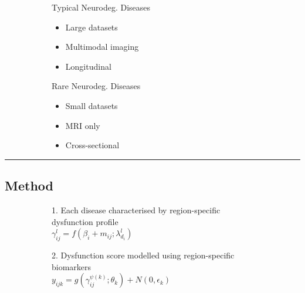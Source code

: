 \documentclass[portrait,a0,final,20pt]{a0poster}
\newcommand{\fnt}[1]{\LARGE{#1}}
\begin{document}
{\begin{multicols}{2}
\begin{figure}[H]
\fnt{
\begin{subfigure}{0.48\columnwidth}
  Typical Neurodeg. Diseases
  
  \begin{itemize}
   \item Large datasets \yes
   \item Multimodal imaging \yes
   \item Longitudinal \yes
   
  \end{itemize}
\end{subfigure}
\begin{subfigure}{0.48\columnwidth}
 
   Rare Neurodeg. Diseases
  
  \begin{itemize}
   \item Small datasets \no
   \item MRI only \no
   \item Cross-sectional \no
  \end{itemize}
 
\end{subfigure}
 }
\end{figure}

\end{multicols}
\hrule

\begin{multicols}{2}							
\raggedcolumns	

\section*{Method}
 
\vspace{1em}
\begin{figure}[H]
 \centering
   \begin{subfigure}{0.49\columnwidth}
   \centering
   \fnt{1. Each disease characterised by region-specific dysfunction profile}\\
   $ \gamma_{ij}^l = f(\beta_{i} + m_{ij}; \lambda_{d_i}^l) $\\
   
  \end{subfigure}
  \begin{subfigure}{0.49\columnwidth}
   \centering
   \fnt{2. Dysfunction score modelled using region-specific biomarkers}\\
   $ y_{ijk} = g( \gamma_{ij}^{\psi(k)} ; \theta_k) + N(0,\epsilon_k) $
  \end{subfigure}


\end{figure}
\end{multicols}}
\end{document}
